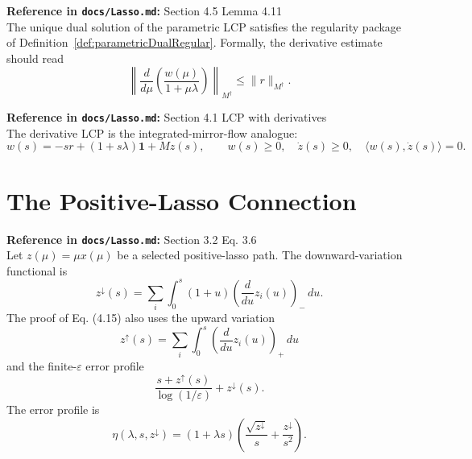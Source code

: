 \begin{lemma}\label{lem:parametricDualRegular}
  \textbf{Reference in \texttt{docs/Lasso.md}:} Section 4.5 Lemma 4.11\\
The unique dual solution of the parametric LCP satisfies the regularity package
of Definition~\ref{def:parametricDualRegular}.
Formally, the derivative estimate should read
\[
  \left\|
    \frac{d}{d\mu}\left(\frac{w(\mu)}{1+\mu\lambda}\right)
  \right\|_{M^\dagger}
  \le
  \|r\|_{M^\dagger}.
\]
\end{lemma}

\begin{definition}\label{def:lcpWithDerivatives}
  \textbf{Reference in \texttt{docs/Lasso.md}:} Section 4.1 LCP with derivatives\\
The derivative LCP is the integrated-mirror-flow analogue:
\[
  w(s)=-sr+(1+s\lambda)\mathbf{1}+Mz(s),
  \qquad
  w(s)\ge 0,\quad \dot z(s)\ge 0,\quad
  \langle w(s),\dot z(s)\rangle=0.
\]
\end{definition}

\section{The Positive-Lasso Connection}

\begin{definition}\label{def:positivePathQuantities}
  \textbf{Reference in \texttt{docs/Lasso.md}:} Section 3.2 Eq. 3.6\\
Let $z(\mu)=\mu x(\mu)$ be a selected positive-lasso path.
The downward-variation functional is
\[
  z^\downarrow(s)
    = \sum_i\int_0^s (1+u)\left(\frac{d}{du}z_i(u)\right)_-\,du.
\]
The proof of Eq. (4.15) also uses the upward variation
\[
  z^\uparrow(s)
    =
    \sum_i\int_0^s
      \left(\frac{d}{du}z_i(u)\right)_+\,du
\]
and the finite-\(\varepsilon\) error profile
\[
  \frac{s+z^\uparrow(s)}{\log(1/\varepsilon)}+z^\downarrow(s).
\]
The error profile is
\[
  \eta(\lambda,s,z^\downarrow)
    = (1+\lambda s)
      \left(\frac{\sqrt{z^\downarrow}}{s}
        + \frac{z^\downarrow}{s^2}\right).
\]
\end{definition}

